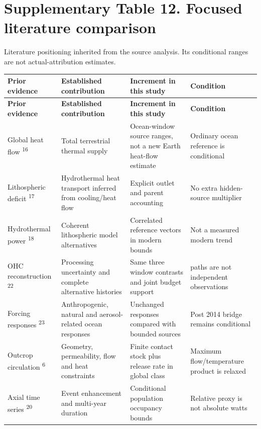 \section*{Supplementary Table 12. Focused literature comparison}
Literature positioning inherited from the source analysis. Its conditional ranges are not actual-attribution estimates.\par
{\fontsize{8.3}{10.1}\selectfont\begin{longtable}{>{\raggedright\arraybackslash}p{29.076mm}>{\raggedright\arraybackslash}p{40.383mm}>{\raggedright\arraybackslash}p{51.691mm}>{\raggedright\arraybackslash}p{40.383mm}}\toprule
\textbf{Prior evidence} & \textbf{Established contribution} & \textbf{Increment in this study} & \textbf{Condition}\\\midrule\endfirsthead
\textbf{Prior evidence} & \textbf{Established contribution} & \textbf{Increment in this study} & \textbf{Condition}\\\midrule\endhead
\bottomrule\endfoot
Global heat flow \textsuperscript{16} & Total terrestrial thermal supply & Ocean-window source ranges, not a new Earth heat-flow estimate & Ordinary ocean reference is conditional\\
Lithospheric deficit \textsuperscript{17} & Hydrothermal heat transport inferred from cooling/\allowbreak{}heat flow & Explicit outlet and parent accounting & No extra hidden-source multiplier\\
Hydrothermal power \textsuperscript{18} & Coherent lithospheric model alternatives & Correlated reference vectors in modern bounds & Not a measured modern trend\\
OHC reconstruction \textsuperscript{22} & Processing uncertainty and complete alternative histories & Same three window contrasts and joint budget support & 908 paths are not independent observations\\
Forcing responses \textsuperscript{23} & Anthropogenic, natural and aerosol-related ocean responses & Unchanged responses compared with bounded sources & Post 2014 bridge remains conditional\\
Outcrop circulation \textsuperscript{6} & Geometry, permeability, flow and heat constraints & Finite contact stock plus release rate in global class & Maximum flow/\allowbreak{}temperature product is relaxed\\
Axial time series \textsuperscript{20} & Event enhancement and multi-year duration & Conditional population occupancy bounds & Relative proxy is not absolute watts\\

\end{longtable}}
